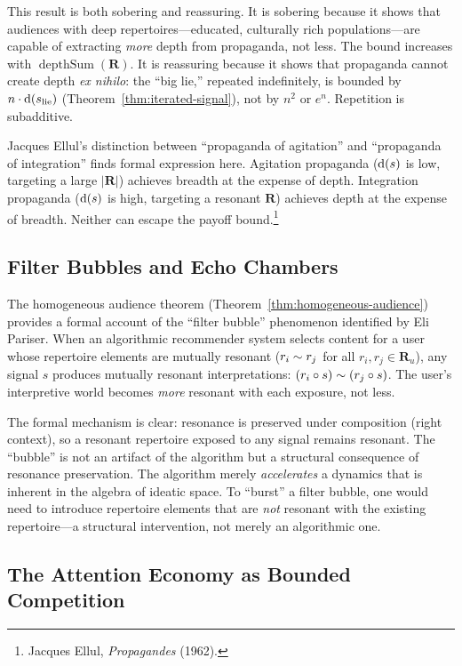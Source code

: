 This result is both sobering and reassuring.  It is sobering because it shows
that audiences with deep repertoires---educated, culturally rich
populations---are capable of extracting \emph{more} depth from propaganda, not
less.  The bound increases with $\operatorname{depthSum}(\mathbf{R})$.  It is
reassuring because it shows that propaganda cannot create depth \emph{ex
nihilo}: the ``big lie,'' repeated indefinitely, is bounded by
$n \cdot \operatorname{d}(s_{\text{lie}})$ (Theorem~\ref{thm:iterated-signal}), not
by $n^2$ or $e^n$.  Repetition is subadditive.

Jacques Ellul's distinction between ``propaganda of agitation'' and
``propaganda of integration'' finds formal expression here.  Agitation
propaganda ($\operatorname{d}(s)$ is low, targeting a large $|\mathbf{R}|$) achieves
breadth at the expense of depth.  Integration propaganda ($\operatorname{d}(s)$ is
high, targeting a resonant $\mathbf{R}$) achieves depth at the expense of
breadth.  Neither can escape the payoff bound.\footnote{Jacques Ellul,
\textit{Propagandes} (1962).}

\subsection{Filter Bubbles and Echo Chambers}

The homogeneous audience theorem (Theorem~\ref{thm:homogeneous-audience})
provides a formal account of the ``filter bubble'' phenomenon identified by
Eli Pariser.  When an algorithmic recommender system selects content for a user
whose repertoire elements are mutually resonant ($r_i \sim r_j$ for all
$r_i, r_j \in \mathbf{R}_u$), any signal $s$ produces mutually resonant
interpretations: $(r_i \circ s) \sim (r_j \circ s)$.  The user's
interpretive world becomes \emph{more} resonant with each exposure, not less.

The formal mechanism is clear: resonance is preserved under composition
(right context), so a resonant repertoire exposed to any signal remains
resonant.  The ``bubble'' is not an artifact of the algorithm but a
structural consequence of resonance preservation.  The algorithm merely
\emph{accelerates} a dynamics that is inherent in the algebra of
ideatic space.  To ``burst'' a filter bubble, one would need to introduce
repertoire elements that are \emph{not} resonant with the existing
repertoire---a structural intervention, not merely an algorithmic one.

\subsection{The Attention Economy as Bounded Competition}

